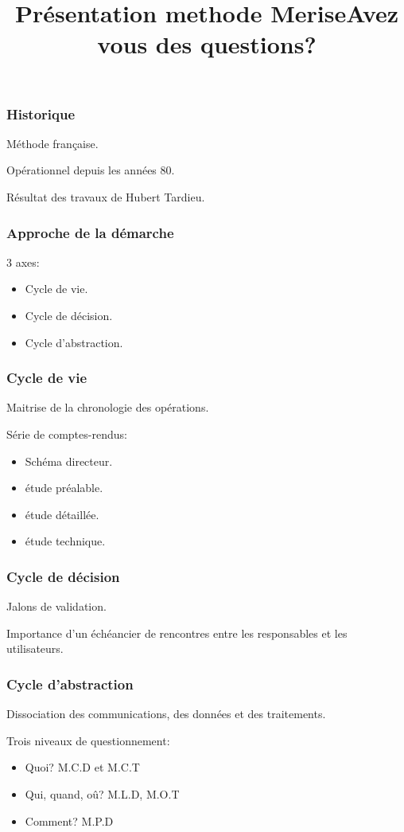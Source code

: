\documentclass{beamer}
\title{Présentation methode Merise}
\institute{Ynov Bordeaux}
\begin{document}
\begin{frame}
\titlepage
\end{frame}


\begin{frame}
\frametitle{Historique}
Méthode française.

Opérationnel depuis les années 80.

Résultat des travaux de Hubert Tardieu.
\end{frame}

\begin{frame}
\frametitle{Approche de la démarche}
3 axes:
\begin{itemize}
    \item Cycle de vie.
    \item Cycle de décision.
    \item Cycle d'abstraction.
\end{itemize}
\end{frame}
\begin{frame}
\frametitle{Cycle de vie}

Maitrise de la chronologie des opérations.

Série de comptes-rendus:

\begin{itemize}
    \item Schéma directeur.
    \item étude préalable.
    \item étude détaillée.
    \item étude technique.
\end{itemize}
\end{frame}

\begin{frame}
\frametitle{Cycle de décision}
Jalons de validation.

Importance d'un échéancier de rencontres entre les responsables et les utilisateurs.
\end{frame}

\begin{frame}
\frametitle{Cycle d'abstraction}
Dissociation des communications, des données et des traitements.

Trois niveaux de questionnement:
\begin{itemize}
    \item Quoi? M.C.D et M.C.T
    \item Qui, quand, oû? M.L.D, M.O.T
    \item Comment? M.P.D
\end{itemize}

\end{frame}
\begin{frame}
\title{Avez vous des questions?}
\titlepage
\end{frame}
\end{document}

